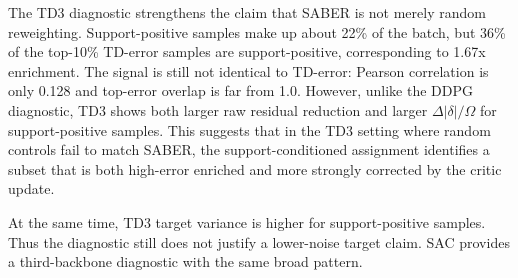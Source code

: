 \documentclass[letterpaper]{article}
\begin{document}
The TD3 diagnostic strengthens the claim that SABER is not merely random reweighting. Support-positive samples make up about 22\% of the batch, but 36\% of the top-10\% TD-error samples are support-positive, corresponding to 1.67x enrichment. The signal is still not identical to TD-error: Pearson correlation is only 0.128 and top-error overlap is far from 1.0. However, unlike the DDPG diagnostic, TD3 shows both larger raw residual reduction and larger \(\Delta|\delta|/\Omega\) for support-positive samples. This suggests that in the TD3 setting where random controls fail to match SABER, the support-conditioned assignment identifies a subset that is both high-error enriched and more strongly corrected by the critic update.

At the same time, TD3 target variance is higher for support-positive samples. Thus the diagnostic still does not justify a lower-noise target claim. SAC provides a third-backbone diagnostic with the same broad pattern.
\end{document}
